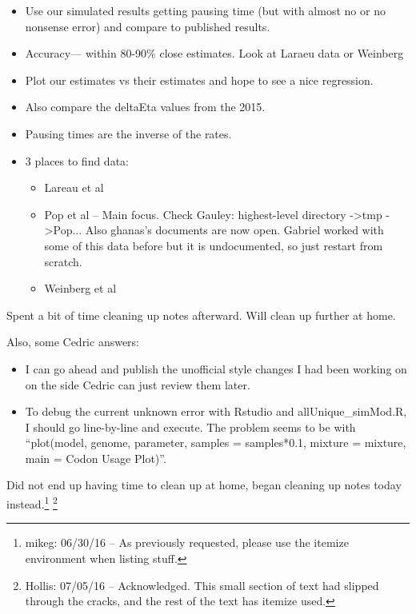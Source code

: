 \documentclass[12pt,hyperref]{labbook}
\begin{document}
\begin{itemize}
    \item Use our simulated results getting pausing time
    (but with almost no or no nonsense error) and compare to published results.
    \item Accuracy— within 80-90\% close estimates. Look at Laraeu data or Weinberg
    \item Plot our estimates vs their estimates and hope to see a nice regression.
    \item Also compare the deltaEta values from the 2015.
    \item Pausing times are the inverse of the rates.
    \item 3 places to find data:
    \begin{itemize}
        \item Lareau et al
        \item 
        Pop et al -- Main focus. Check Gauley: highest-level directory -\textgreater tmp -\textgreater Pop...
        Also ghanas's documents are now open. Gabriel worked with some of this data before but it
        is undocumented, so just restart from scratch.
        \item Weinberg et al
    \end{itemize}
\end{itemize}

Spent a bit of time cleaning up notes afterward. Will clean up further at home.

Also, some Cedric answers:
\begin{itemize}
    \item 
    I can go ahead and publish the unofficial style changes I had been working on on the side
    Cedric can just review them later.
    \item
    To debug the current unknown error with Rstudio and allUnique\_simMod.R, I should
    go line-by-line and execute. 
    The problem seems to be with \enquote{plot(model, genome, parameter, samples = samples*0.1, mixture = mixture, main = Codon Usage Plot)}.
\end{itemize}


Did not end up having time to clean up at home, began cleaning up notes today instead.\footnote{mikeg: 06/30/16 -- As previously requested, please use the itemize environment when listing stuff. 
}
\footnote{Hollis: 07/05/16 -- Acknowledged. This small section of text had slipped through the cracks, and the rest of the text has itemize used.}
\end{document}

